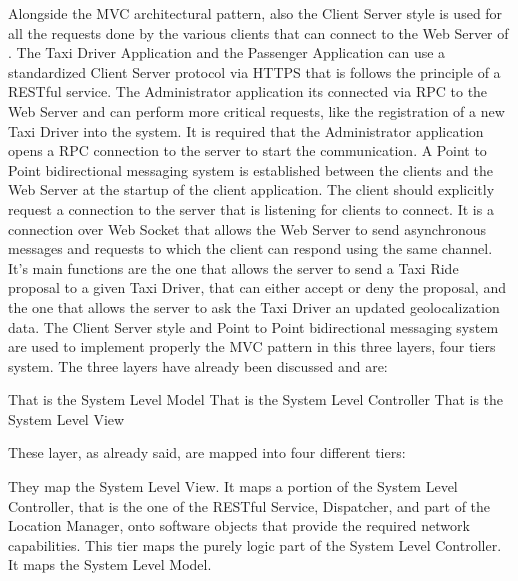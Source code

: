 Alongside the MVC architectural pattern, also the Client Server style is used for all the requests done by the various clients that can connect to the Web Server of \myTaxiService{}. The Taxi Driver Application and the Passenger Application can use a standardized Client Server protocol via HTTPS that is follows the principle of a RESTful service. The Administrator application its connected via RPC to the Web Server and can perform more critical requests, like the registration of a new Taxi Driver into the system. It is required that the Administrator application opens a RPC connection to the server to start the communication.
A Point to Point bidirectional messaging system is established between the clients and the Web Server at the startup of the client application. The client should explicitly request a connection to the server that is listening for clients to connect. It is a connection over Web Socket that allows the Web Server to send asynchronous messages and requests to which the client can respond using the same channel. It's main functions are the one that allows the server to send a Taxi Ride proposal to a given Taxi Driver, that can either accept or deny the proposal, and the one that allows the server to ask the Taxi Driver an updated geolocalization data.
The Client Server style and Point to Point bidirectional messaging system are used to implement properly the MVC pattern in this three layers, four tiers system.
The three layers have already been discussed and are:
\begin{itemize}
	 That is the System Level Model
	 That is the System Level Controller
	 That is the System Level View
\end{itemize}
These layer, as already said, are mapped into four different tiers:
\begin{itemize}
	 They map the System Level View.
	 It maps a portion of the System Level Controller, that is the one of the RESTful Service, Dispatcher, and part of the Location Manager, onto software objects that provide the required network capabilities.
	 This tier maps the purely logic part of the System Level Controller.
	 It maps the System Level Model.
\end{itemize}

